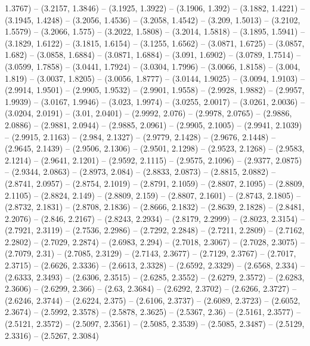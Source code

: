 {  1.3767) -- (3.2157, 1.3846) -- (3.1925, 1.3922) -- (3.1906, 1.392) -- (3.1882,
   1.4221) -- (3.1945, 1.4248) -- (3.2056, 1.4536) -- (3.2058, 1.4542) -- 
  (3.209, 1.5013) -- (3.2102, 1.5579) -- (3.2066, 1.575) -- (3.2022, 1.5808) -- 
  (3.2014, 1.5818) -- (3.1895, 1.5941) -- (3.1829, 1.6122) -- (3.1815, 1.6154) 
  -- (3.1255, 1.6562) -- (3.0871, 1.6725) -- (3.0857, 1.682) -- (3.0858, 1.6884)
   -- (3.0871, 1.6884) -- (3.091, 1.6902) -- (3.0789, 1.7514) -- (3.0599, 
  1.7858) -- (3.0441, 1.7924) -- (3.0304, 1.7996) -- (3.0066, 1.8158) -- (3.004,
   1.819) -- (3.0037, 1.8205) -- (3.0056, 1.8777) -- (3.0144, 1.9025) -- 
  (3.0094, 1.9103) -- (2.9914, 1.9501) -- (2.9905, 1.9532) -- (2.9901, 1.9558) 
  -- (2.9928, 1.9882) -- (2.9957, 1.9939) -- (3.0167, 1.9946) -- (3.023, 1.9974)
   -- (3.0255, 2.0017) -- (3.0261, 2.0036) -- (3.0204, 2.0191) -- (3.01, 2.0401)
   -- (2.9992, 2.076) -- (2.9978, 2.0765) -- (2.9886, 2.0886) -- (2.9881, 
  2.0944) -- (2.9885, 2.0961) -- (2.9905, 2.1005) -- (2.9941, 2.1039) -- 
  (2.9915, 2.1163) -- (2.984, 2.1327) -- (2.9779, 2.1428) -- (2.9676, 2.1448) --
   (2.9645, 2.1439) -- (2.9506, 2.1306) -- (2.9501, 2.1298) -- (2.9523, 2.1268) 
  -- (2.9583, 2.1214) -- (2.9641, 2.1201) -- (2.9592, 2.1115) -- (2.9575, 
  2.1096) -- (2.9377, 2.0875) -- (2.9344, 2.0863) -- (2.8973, 2.084) -- (2.8833,
   2.0873) -- (2.8815, 2.0882) -- (2.8741, 2.0957) -- (2.8754, 2.1019) -- 
  (2.8791, 2.1059) -- (2.8807, 2.1095) -- (2.8809, 2.1105) -- (2.8824, 2.149) --
   (2.8809, 2.159) -- (2.8807, 2.1601) -- (2.8743, 2.1805) -- (2.8732, 2.1831) 
  -- (2.8708, 2.1836) -- (2.8666, 2.1832) -- (2.8639, 2.1828) -- (2.8481, 
  2.2076) -- (2.846, 2.2167) -- (2.8243, 2.2934) -- (2.8179, 2.2999) -- (2.8023,
   2.3154) -- (2.7921, 2.3119) -- (2.7536, 2.2986) -- (2.7292, 2.2848) -- 
  (2.7211, 2.2809) -- (2.7162, 2.2802) -- (2.7029, 2.2874) -- (2.6983, 2.294) --
   (2.7018, 2.3067) -- (2.7028, 2.3075) -- (2.7079, 2.31) -- (2.7085, 2.3129) --
   (2.7143, 2.3677) -- (2.7129, 2.3767) -- (2.7017, 2.3715) -- (2.6626, 2.3336) 
  -- (2.6613, 2.3328) -- (2.6592, 2.3329) -- (2.6568, 2.334) -- (2.6333, 2.3493)
   -- (2.6306, 2.3515) -- (2.6285, 2.3552) -- (2.6279, 2.3572) -- (2.6283, 
  2.3606) -- (2.6299, 2.366) -- (2.63, 2.3684) -- (2.6292, 2.3702) -- (2.6266, 
  2.3727) -- (2.6246, 2.3744) -- (2.6224, 2.375) -- (2.6106, 2.3737) -- (2.6089,
   2.3723) -- (2.6052, 2.3674) -- (2.5992, 2.3578) -- (2.5878, 2.3625) -- 
  (2.5367, 2.36) -- (2.5161, 2.3577) -- (2.5121, 2.3572) -- (2.5097, 2.3561) -- 
  (2.5085, 2.3539) -- (2.5085, 2.3487) -- (2.5129, 2.3316) -- (2.5267, 2.3084) 
}
